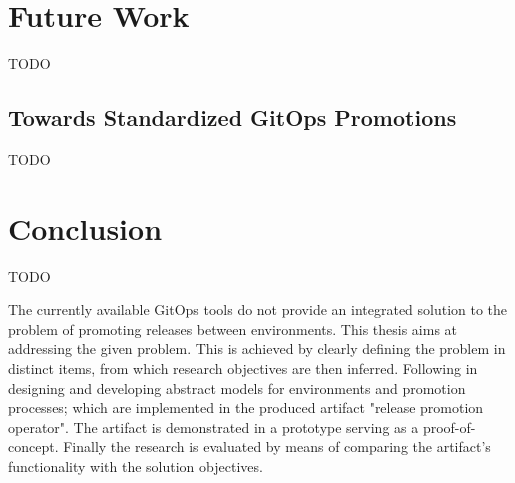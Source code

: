 \chapter{Future Work}
\label{future-work}

TODO

\section{Towards Standardized GitOps Promotions}

TODO















\chapter{Conclusion}
\label{conclusion}

TODO


%
%
%
%

\noindent
The currently available GitOps tools
do not provide an integrated solution to
the problem of promoting releases between environments.
This thesis aims at addressing the given problem.
This is achieved by
clearly defining the problem in distinct items,
from which research objectives are then inferred.
Following in designing and developing abstract models for
environments and promotion processes;
which are implemented in the produced artifact "release promotion operator".
The artifact is demonstrated in a prototype serving as a proof-of-concept.
Finally the research is evaluated by means of
comparing the artifact's functionality with the solution objectives.
\bigskip

